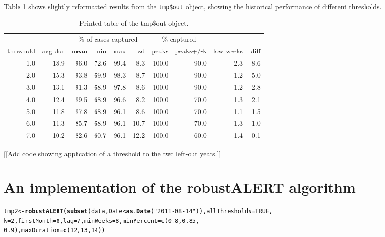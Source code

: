 \documentclass[11pt]{article}\usepackage[]{graphicx}\usepackage[]{color}
\makeatletter
\newcommand{\hlnum}[1]{\textcolor[rgb]{0.686,0.059,0.569}{#1}}%
\newcommand{\hlstr}[1]{\textcolor[rgb]{0.192,0.494,0.8}{#1}}%
\newcommand{\hlopt}[1]{\textcolor[rgb]{0,0,0}{#1}}%
\newcommand{\hlstd}[1]{\textcolor[rgb]{0.345,0.345,0.345}{#1}}%
\newcommand{\hlkwb}[1]{\textcolor[rgb]{0.69,0.353,0.396}{#1}}%
\newcommand{\hlkwc}[1]{\textcolor[rgb]{0.333,0.667,0.333}{#1}}%
\newcommand{\hlkwd}[1]{\textcolor[rgb]{0.737,0.353,0.396}{\textbf{#1}}}%
\newenvironment{kframe}{%
 \def\at@end@of@kframe{}%
 \ifinner\ifhmode%
  \def\at@end@of@kframe{\end{minipage}}%
  \begin{minipage}{\columnwidth}%
 \fi\fi%
 \def\FrameCommand##1{\hskip\@totalleftmargin \hskip-\fboxsep
 \colorbox{shadecolor}{##1}\hskip-\fboxsep
     \hskip-\linewidth \hskip-\@totalleftmargin \hskip\columnwidth}%
 \MakeFramed {\advance\hsize-\width
   \@totalleftmargin\z@ \linewidth\hsize
   \@setminipage}}%
 {\par\unskip\endMakeFramed%
 \at@end@of@kframe}
\newenvironment{knitrout}{}{} %
\makeatother
\begin{document}
Table \ref{tab:results} shows slightly reformatted results from the {\tt tmp\$out} object, showing the historical performance of different thresholds.
\begin{table}[ht]
\centering
\caption{Printed table of the tmp\$out object.} 
\label{tab:results}
\begin{tabular}{rrrrrrrrrr}
  &&\multicolumn{4}{c}{\% of cases captured}&\multicolumn{2}{c}{\% captured}&& \\ \cline{3-6} \cline{7-8}threshold & avg dur & mean & min & max & sd & peaks & peaks+/-k & low weeks & diff \\ 
  \hline
1.0 & 18.9 & 96.0 & 72.6 & 99.4 & 8.3 & 100.0 & 90.0 & 2.3 & 8.6 \\ 
  2.0 & 15.3 & 93.8 & 69.9 & 98.3 & 8.7 & 100.0 & 90.0 & 1.2 & 5.0 \\ 
  3.0 & 13.1 & 91.3 & 68.9 & 97.8 & 8.6 & 100.0 & 90.0 & 1.2 & 2.8 \\ 
  4.0 & 12.4 & 89.5 & 68.9 & 96.6 & 8.2 & 100.0 & 70.0 & 1.3 & 2.1 \\ 
  5.0 & 11.8 & 87.8 & 68.9 & 96.1 & 8.6 & 100.0 & 70.0 & 1.1 & 1.5 \\ 
  6.0 & 11.3 & 85.7 & 68.9 & 96.1 & 10.7 & 100.0 & 70.0 & 1.3 & 1.0 \\ 
  7.0 & 10.2 & 82.6 & 60.7 & 96.1 & 12.2 & 100.0 & 60.0 & 1.4 & -0.1 \\ 
   \hline
\end{tabular}
\end{table}



[[Add code showing application of a threshold to the two left-out years.]]

\section{An implementation of the robustALERT algorithm}

\begin{knitrout}
\color{fgcolor}\begin{kframe}
\begin{alltt}
\hlstd{tmp2} \hlkwb{<-} \hlkwd{robustALERT}\hlstd{(}\hlkwd{subset}\hlstd{(data, Date} \hlopt{<} \hlkwd{as.Date}\hlstd{(}\hlstr{"2011-08-14"}\hlstd{)),} \hlkwc{allThresholds} \hlstd{=} \hlnum{TRUE}\hlstd{,}
    \hlkwc{k} \hlstd{=} \hlnum{2}\hlstd{,} \hlkwc{firstMonth} \hlstd{=} \hlnum{8}\hlstd{,} \hlkwc{lag} \hlstd{=} \hlnum{7}\hlstd{,} \hlkwc{minWeeks} \hlstd{=} \hlnum{8}\hlstd{,} \hlkwc{minPercent} \hlstd{=} \hlkwd{c}\hlstd{(}\hlnum{0.8}\hlstd{,} \hlnum{0.85}\hlstd{,}
        \hlnum{0.9}\hlstd{),} \hlkwc{maxDuration} \hlstd{=} \hlkwd{c}\hlstd{(}\hlnum{12}\hlstd{,} \hlnum{13}\hlstd{,} \hlnum{14}\hlstd{))}
\end{alltt}
\end{kframe}
\end{knitrout}
\end{document}
